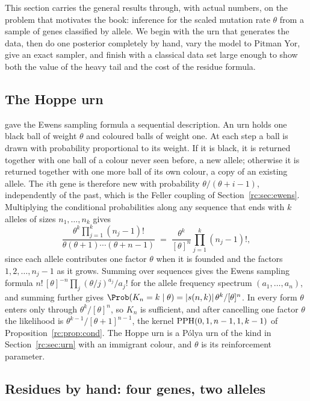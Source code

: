 This section carries the general results through, with actual numbers, on the problem that motivates the book: inference for the scaled mutation rate $\theta$ from a sample of genes classified by allele. We begin with the urn that generates the data, then do one posterior completely by hand, vary the model to Pitman Yor, give an exact sampler, and finish with a classical data set large enough to show both the value of the heavy tail and the cost of the residue formula.

\subsection{The Hoppe urn}

\citet{rc:hoppe1984} gave the Ewens sampling formula a sequential description. An urn holds one black ball of weight $\theta$ and coloured balls of weight one. At each step a ball is drawn with probability proportional to its weight. If it is black, it is returned together with one ball of a colour never seen before, a new allele; otherwise it is returned together with one more ball of its own colour, a copy of an existing allele. The $i$th gene is therefore new with probability $\theta/(\theta+i-1)$, independently of the past, which is the Feller coupling of Section~\ref{rc:sec:ewens}. Multiplying the conditional probabilities along any sequence that ends with $k$ alleles of sizes $n_1,\dots,n_k$ gives
\[
\frac{\theta^k\prod_{j=1}^k(n_j-1)!}{\theta(\theta+1)\cdots(\theta+n-1)}\;=\;\frac{\theta^k}{[\theta]^n}\prod_{j=1}^k(n_j-1)!,
\]
since each allele contributes one factor $\theta$ when it is founded and the factors $1,2,\dots,n_j-1$ as it grows. Summing over sequences gives the Ewens sampling formula $n!\,[\theta]^{-n}\prod_j(\theta/j)^{a_j}/a_j!$ for the allele frequency spectrum $(a_1,\dots,a_n)$, and summing further gives $\Prob(K_n=k\mid\theta)=|s(n,k)|\,\theta^k/[\theta]^n$. In every form $\theta$ enters only through $\theta^k/[\theta]^n$, so $K_n$ is sufficient, and after cancelling one factor $\theta$ the likelihood is $\theta^{k-1}/[\theta+1]^{n-1}$, the kernel $\mathrm{PPH}(0,1,n-1,1,k-1)$ of Proposition~\ref{rc:prop:cond}. The Hoppe urn is a P\'olya urn of the kind in Section~\ref{rc:sec:urn} with an immigrant colour, and $\theta$ is its reinforcement parameter.

\subsection{Residues by hand: four genes, two alleles}

